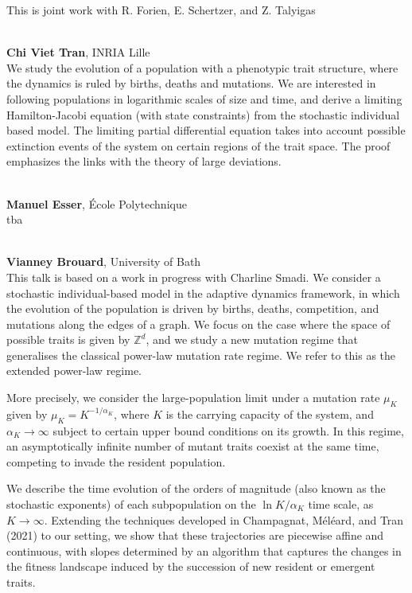 \documentclass[12pt,a4paper]{article}
\begin{document}
 This is joint work with R. Forien, E. Schertzer, and Z. Talyigas 

\bigskip\bigskip

\\[1ex]{ \large \textbf{ Chi Viet Tran}}, INRIA Lille \\[2ex] We study the evolution of a population with a phenotypic trait structure, where the dynamics is ruled by births, deaths and mutations. We are interested in following populations in logarithmic scales of size and time, and derive a limiting Hamilton-Jacobi equation (with state constraints) from the stochastic individual based model. The limiting partial differential equation takes into account possible extinction events of the system on certain regions of the trait space. The proof emphasizes the links with the theory of large deviations. 

\bigskip\bigskip

\\[1ex]{ \large \textbf{ Manuel Esser}}, École Polytechnique \\[2ex] tba 

\bigskip\bigskip

\\[1ex]{ \large \textbf{ Vianney Brouard}}, University of Bath \\[2ex] This talk is based on a work in progress with Charline Smadi. We consider a stochastic individual-based model in the adaptive dynamics framework, in which the evolution of the population is driven by births, deaths, competition, and mutations along the edges of a graph. We focus on the case where the space of possible traits is given by $\mathbb{Z}^d$, and we study a new mutation regime that generalises the classical power-law mutation rate regime. We refer to this as the extended power-law regime. 


 More precisely, we consider the large-population limit under a mutation rate $\mu_K$ given by $\mu_K = K^{-1/\alpha_K}$, where $K$ is the carrying capacity of the system, and $\alpha_K \to \infty$ subject to certain upper bound conditions on its growth. In this regime, an asymptotically infinite number of mutant traits coexist at the same time, competing to invade the resident population. 


 We describe the time evolution of the orders of magnitude (also known as the stochastic exponents) of each subpopulation on the $\ln K/\alpha_K$ time scale, as $K \to \infty$. Extending the techniques developed in Champagnat, Méléard, and Tran (2021) to our setting, we show that these trajectories are piecewise affine and continuous, with slopes determined by an algorithm that captures the changes in the fitness landscape induced by the succession of new resident or emergent traits. 
\end{document}

